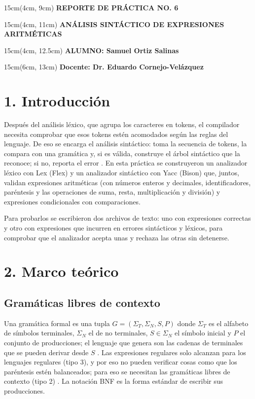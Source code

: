 \documentclass{article}
\begin{document}
\BgThispage
\-
\begin{textblock*}{15cm}(4cm, 9cm)
    {\fontsize{30pt}{16pt}\selectfont
    \textcolor{rojo}{\textbf{REPORTE DE PRÁCTICA NO. 6}}
    }
\end{textblock*}
\begin{textblock*}{15cm}(4cm, 11cm)
    {\fontsize{15pt}{16pt}\selectfont
    \textcolor{rojo}{\textbf{ANÁLISIS SINTÁCTICO DE EXPRESIONES ARITMÉTICAS}}
    }
\end{textblock*}
\begin{textblock*}{15cm}(4cm, 12.5cm)
    {\fontsize{13pt}{16pt}\selectfont
    \textcolor{rojo}{\textbf{ALUMNO: Samuel Ortiz Salinas}}
    }
\end{textblock*}
\begin{textblock*}{15cm}(6cm, 13cm)
    {\fontsize{11pt}{16pt}\selectfont
    \textcolor{rojo}{\textbf{Docente: Dr. Eduardo Cornejo-Velázquez}}
    }
\end{textblock*}

\newpage

\section{1. Introducción}
    Después del análisis léxico, que agrupa los caracteres en tokens, el compilador necesita comprobar que esos tokens estén acomodados según las reglas del lenguaje. De eso se encarga el análisis sintáctico: toma la secuencia de tokens, la compara con una gramática y, si es válida, construye el árbol sintáctico que la reconoce; si no, reporta el error \cite{Aho2007}. En esta práctica se construyeron un analizador léxico con Lex (Flex) y un analizador sintáctico con Yacc (Bison) que, juntos, validan expresiones aritméticas (con números enteros y decimales, identificadores, paréntesis y las operaciones de suma, resta, multiplicación y división) y expresiones condicionales con comparaciones.

    Para probarlos se escribieron dos archivos de texto: uno con expresiones correctas y otro con expresiones que incurren en errores sintácticos y léxicos, para comprobar que el analizador acepta unas y rechaza las otras sin detenerse.

\section{2. Marco teórico}
    \subsection{Gramáticas libres de contexto}
    Una gramática formal es una tupla $G = (\Sigma_T, \Sigma_N, S, P)$ donde $\Sigma_T$ es el alfabeto de símbolos terminales, $\Sigma_N$ el de no terminales, $S \in \Sigma_N$ el símbolo inicial y $P$ el conjunto de producciones; el lenguaje que genera son las cadenas de terminales que se pueden derivar desde $S$ \cite{Hopcroft2007}. Las expresiones regulares solo alcanzan para los lenguajes regulares (tipo 3), y por eso no pueden verificar cosas como que los paréntesis estén balanceados; para eso se necesitan las gramáticas libres de contexto (tipo 2) \cite{Giro2015}. La notación BNF es la forma estándar de escribir sus producciones.
\end{document}
